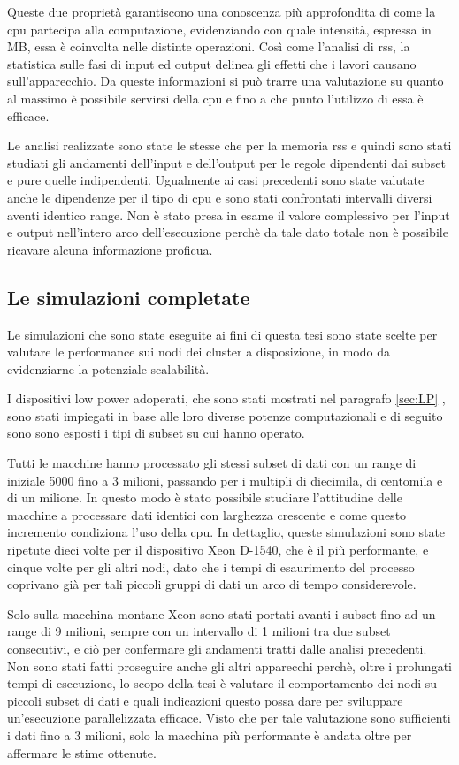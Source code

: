 Queste due proprietà garantiscono una conoscenza più approfondita di come la cpu partecipa alla computazione, evidenziando con quale intensità, espressa in MB, essa è coinvolta nelle distinte operazioni.
Così come l'analisi di rss, la statistica sulle fasi di input ed output delinea gli effetti che i lavori causano sull'apparecchio.
Da queste informazioni si può trarre una valutazione su quanto al massimo è possibile servirsi della cpu e fino a che punto l'utilizzo di essa è efficace.

Le analisi realizzate sono state le stesse che per la memoria rss e quindi sono stati studiati gli andamenti dell'input e dell'output per le regole dipendenti dai subset e pure quelle indipendenti.
Ugualmente ai casi precedenti sono state valutate anche le dipendenze per il tipo di cpu e sono stati confrontati intervalli diversi aventi identico range.
Non è stato presa in esame il valore complessivo per l'input e output nell'intero arco dell'esecuzione perchè da tale dato totale non è possibile ricavare alcuna informazione proficua.
 
\subsection{Le simulazioni completate} 
Le simulazioni che sono state eseguite ai fini di questa tesi sono state scelte per valutare le performance sui nodi dei cluster a disposizione, in modo da evidenziarne la potenziale scalabilità.

I dispositivi low power adoperati, che sono stati mostrati nel paragrafo \ref{sec:LP} , sono stati impiegati in base alle loro diverse potenze computazionali e di seguito sono sono esposti i tipi di subset su cui hanno operato.

Tutti le macchine hanno processato gli stessi subset di dati con un range di iniziale 5000 fino a 3 milioni, passando per i multipli di diecimila, di centomila e di un milione.
In questo modo è stato possibile studiare l'attitudine delle macchine a processare dati identici con larghezza crescente e come questo incremento condiziona l'uso della cpu. 
In dettaglio, queste simulazioni sono state ripetute dieci volte per il dispositivo {Xeon D-1540}, che è il più performante, e cinque volte per gli altri nodi, dato che i tempi di esaurimento del processo coprivano già per tali piccoli gruppi di dati un arco di tempo considerevole.

Solo sulla macchina montane Xeon sono stati portati avanti i subset fino ad un range di 9 milioni, sempre con un intervallo di 1 milioni tra due subset consecutivi, e ciò per confermare gli andamenti tratti dalle analisi precedenti.
Non sono stati fatti proseguire anche gli altri apparecchi perchè, oltre i prolungati tempi di esecuzione, lo scopo della tesi è valutare il comportamento dei nodi su piccoli subset di dati e quali indicazioni questo possa dare per sviluppare un'esecuzione parallelizzata efficace. 
Visto che per tale valutazione sono sufficienti i dati fino a 3 milioni, solo la macchina più performante è andata oltre per affermare le stime ottenute.

